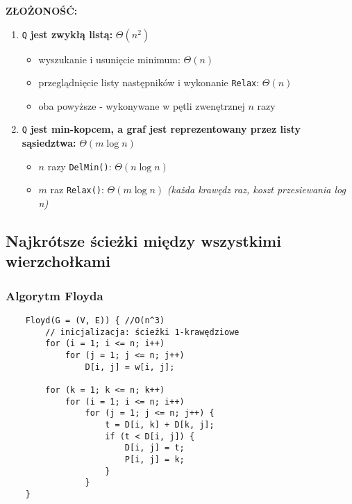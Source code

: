 \documentclass[algorytmy.tex]{subfiles}
\begin{document}
    \textbf{ZŁOŻONOŚĆ:}
    \begin{enumerate}
        \item \texttt{Q} \textbf{jest zwykłą listą:} $\Theta(n^2)$
            \begin{itemize}
                \item wyszukanie i usunięcie minimum: $\Theta(n)$
                \item przeglądnięcie listy następników i wykonanie
                      \texttt{Relax}: $\Theta(n)$
                \item oba powyższe - wykonywane w pętli zwenętrznej $n$ razy
            \end{itemize}

        \item \texttt{Q} \textbf{jest min-kopcem, a graf jest
            reprezentowany przez listy sąsiedztwa:} $\Theta(m \log n)$
            \begin{itemize}
                \item $n$ razy \texttt{DelMin()}: $\Theta(n \log n)$
                \item $m$ raz \texttt{Relax()}: $\Theta(m \log n)$
                      \textit{(każda krawędz raz, koszt przesiewania log n)}
            \end{itemize}
    \end{enumerate}

\pagebreak

\subsection{Najkrótsze ścieżki między wszystkimi wierzchołkami}
    \subsubsection{Algorytm Floyda}

    \begin{verbatim}
    Floyd(G = (V, E)) { //O(n^3)
        // inicjalizacja: ścieżki 1-krawędziowe
        for (i = 1; i <= n; i++)
            for (j = 1; j <= n; j++)
                D[i, j] = w[i, j];

        for (k = 1; k <= n; k++)
            for (i = 1; i <= n; i++)
                for (j = 1; j <= n; j++) {
                    t = D[i, k] + D[k, j];
                    if (t < D[i, j]) {
                        D[i, j] = t;
                        P[i, j] = k;
                    }
                }
    }
    \end{verbatim}
\end{document}
